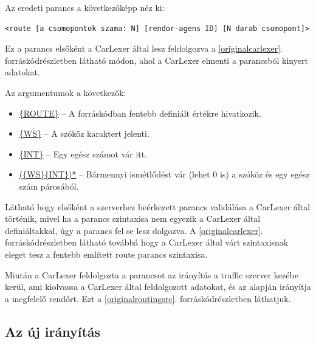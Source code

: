 \documentclass[a4paper,12pt]{report}
\begin{document}
\vspace{2mm}
Az eredeti parancs a következőképp néz ki: 
\begin{lstlisting}
<route [a csomopontok szama: N] [rendor-agens ID] [N darab csomopont]>
\end{lstlisting}

Ez a parancs elsőként a CarLexer által lesz feldolgozva a \ref{originalcarlexer}. forráskódrészletben látható módon, ahol a CarLexer elmenti a parancsból kinyert adatokat.



\vspace{2mm}
Az argumentumok a következők:
\begin{itemize}
\item \url{{ROUTE}} -- A forráskódban fentebb definiált értékre hivatkozik.
\item \url{{WS}} -- A szóköz karaktert jelenti.
\item \url{{INT}} -- Egy egész számot vár itt.
\item \url{({WS}{INT})*} -- Bármennyi ismétlődést vár (lehet 0 is) a szóköz és egy egész szám párosából.
\end{itemize}

\vspace{2mm}
Látható hogy elsőként a szerverhez beérkezett parancs validálása a CarLexer által történik, mivel ha a parancs szintaxisa nem egyezik a CarLexer által definiáltakkal, úgy a parancs fel se lesz dolgozva. A \ref{originalcarlexer}. forráskódrészletben látható továbbá hogy a CarLexer által várt szintaxisnak eleget tesz a fentebb említett route parancs szintaxisa.

\vspace{2mm}
Miután a CarLexer feldolgozta a parancsot az irányítás a traffic szerver kezébe kerül, ami kiolvassa a CarLexer által feldolgozott adatokat, és az alapján irányítja a megfelelő rendőrt. Ezt a \ref{originalroutingsrc}. forráskódrészletben láthatjuk.



\subsection{Az új irányítás}
\label{newrouting}
\end{document}
